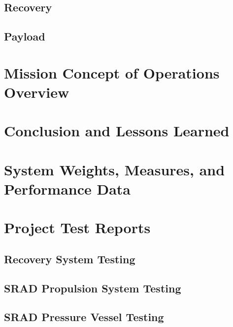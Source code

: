 \documentclass[report, wip, nodwg]{sac}
\begin{document}
	\subsection{Recovery} \label{recovery}

	\subsection{Payload} \label{payload}
 
	\section{Mission Concept of Operations Overview} \label{conops}
 
	\helptext{\CONOPSDescription}

	\section{Conclusion and Lessons Learned}
	\helptext{\ConclusionDescription}

	\appendix
    \renewcommand{\thesubsection}{\thesection.\arabic{subsection}}
    \renewcommand{\thesubsubsection}{\thesubsection.\arabic{subsubsection}}

	\wiptext{
        
	}

	\section{System Weights, Measures, and Performance Data}\label{measures}
	\helptext{\SystemMeasuresDescription}

	\pagebreak
	\section{Project Test Reports}\label{tests}
	\helptext{\TestReportsDescription}

	\subsection{Recovery System Testing}\label{test-recovery}
    \pageleftblank

	\subsection{SRAD Propulsion System Testing}\label{test-propulsion}
	\pageleftblank

	\subsection{SRAD Pressure Vessel Testing}\label{test-pressure-vessel}
	\pageleftblank
\end{document}

